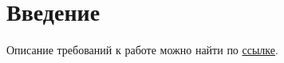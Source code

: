 
\section*{Введение}

Описание требований к работе можно найти по \href{http://it.mmcs.sfedu.ru/docs/IT-papers-2015.pdf}{ссылке}.


